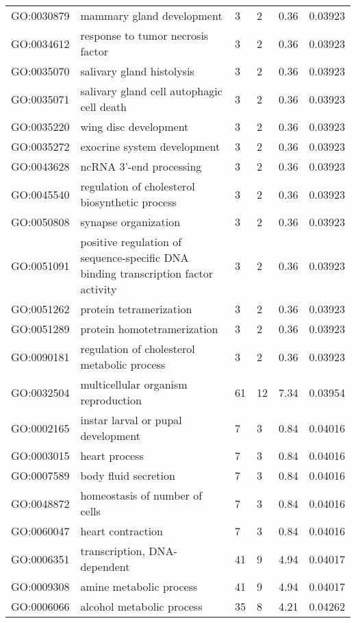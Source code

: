 \documentclass[10pt]{bmc_article}
\newenvironment{bmcformat}{\begin{raggedright}\baselineskip20pt\sloppy\setboolean{publ}{false}}{\end{raggedright}\baselineskip20pt\sloppy}
\begin{document}
\begin{bmcformat}
\begin{longtable}{lp{3cm}llll}
  GO:0030879 & mammary gland development &   3 &   2 & 0.36 & 0.03923 \\ 
  GO:0034612 & response to tumor necrosis factor &   3 &   2 & 0.36 & 0.03923 \\ 
  GO:0035070 & salivary gland histolysis &   3 &   2 & 0.36 & 0.03923 \\ 
  GO:0035071 & salivary gland cell autophagic cell death &   3 &   2 & 0.36 & 0.03923 \\ 
  GO:0035220 & wing disc development &   3 &   2 & 0.36 & 0.03923 \\ 
  GO:0035272 & exocrine system development &   3 &   2 & 0.36 & 0.03923 \\ 
  GO:0043628 & ncRNA 3'-end processing &   3 &   2 & 0.36 & 0.03923 \\ 
  GO:0045540 & regulation of cholesterol biosynthetic process &   3 &   2 & 0.36 & 0.03923 \\ 
  GO:0050808 & synapse organization &   3 &   2 & 0.36 & 0.03923 \\ 
  GO:0051091 & positive regulation of sequence-specific DNA binding transcription factor activity &   3 &   2 & 0.36 & 0.03923 \\ 
  GO:0051262 & protein tetramerization &   3 &   2 & 0.36 & 0.03923 \\ 
  GO:0051289 & protein homotetramerization &   3 &   2 & 0.36 & 0.03923 \\ 
  GO:0090181 & regulation of cholesterol metabolic process &   3 &   2 & 0.36 & 0.03923 \\ 
  GO:0032504 & multicellular organism reproduction &  61 &  12 & 7.34 & 0.03954 \\ 
  GO:0002165 & instar larval or pupal development &   7 &   3 & 0.84 & 0.04016 \\ 
  GO:0003015 & heart process &   7 &   3 & 0.84 & 0.04016 \\ 
  GO:0007589 & body fluid secretion &   7 &   3 & 0.84 & 0.04016 \\ 
  GO:0048872 & homeostasis of number of cells &   7 &   3 & 0.84 & 0.04016 \\ 
  GO:0060047 & heart contraction &   7 &   3 & 0.84 & 0.04016 \\ 
  GO:0006351 & transcription, DNA-dependent &  41 &   9 & 4.94 & 0.04017 \\ 
  GO:0009308 & amine metabolic process &  41 &   9 & 4.94 & 0.04017 \\ 
  GO:0006066 & alcohol metabolic process &  35 &   8 & 4.21 & 0.04262 \\ 

\end{longtable}
\end{bmcformat}
\end{document}
